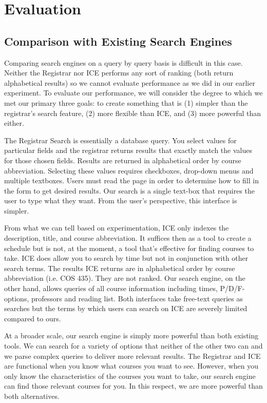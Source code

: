 \documentclass[12pt,letterpaper]{article}
\begin{document}
\section{Evaluation}

\subsection{Comparison with Existing Search Engines}
Comparing search engines on a query by query basis is difficult in this case. Neither the Registrar nor ICE performs any sort of ranking (both return alphabetical results) so we cannot evaluate performance as we did in our earlier experiment. To evaluate our performance, we will consider the degree to which we met our primary three goals: to create something that is (1) simpler than the registrar's search feature, (2) more flexible than ICE, and (3) more powerful than either. 

The Registrar Search is essentially a database query. You select values for particular fields and the registrar returns results that exactly match the values for those chosen fields. Results are returned in alphabetical order by course abbreviation. Selecting these values requires checkboxes, drop-down menus and multiple textboxes. Users must read the page in order to determine how to fill in the form to get desired results. Our search is a single text-box that requires the user to type what they want. From the user's perspective, this interface is simpler. 

From what we can tell based on experimentation, ICE only indexes the description, title, and course abbreviation. It suffices then as a tool to create a schedule but is not, at the moment, a tool that's effective for finding courses to take. ICE does allow you to search by time but not in conjunction with other search terms. The results ICE returns are in alphabetical order by course abbreviation (i.e. COS 435). They are not ranked. Our search engine, on the other hand, allows queries of all course information including times, P/D/F-options, professors and reading list. Both interfaces take free-text queries as searches but the terms by which users can search on ICE are severely limited compared to ours. 
  
At a broader scale, our search engine is simply more powerful than both existing tools. We can search for a variety of options that neither of the other two can and we parse complex queries to deliver more relevant results. The Registrar and ICE are functional when you know what courses you want to see. However, when you only know the characteristics of the courses you want to take, our search engine can find those relevant courses for you. In this respect, we are more powerful than both alternatives.
\end{document}
